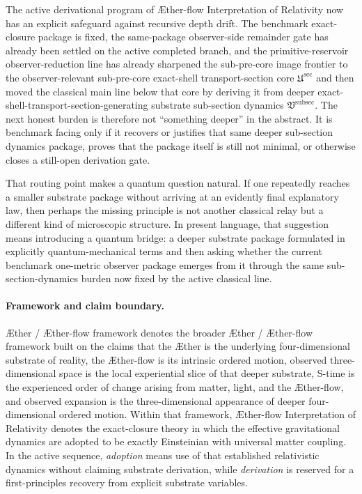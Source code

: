 \documentclass[11pt]{article}
\newcommand{\Aether}{\AE{}ther}
\newcommand{\Aflow}{\AE{}ther-flow}
\newcommand{\TheoryName}{\Aflow{} Interpretation of Relativity}
\newcommand{\TheoryProgram}{\Aether{} / \Aflow{} framework}
\newcommand{\SubPreSectionCore}{\mathfrak U^{\mathrm{sec}}}
\newcommand{\SubSectionPackage}{\mathfrak V^{\mathrm{subsec}}}
\begin{document}
The active derivational program of \TheoryName{} now has an explicit safeguard against recursive depth drift. The benchmark exact-closure package is fixed, the same-package observer-side remainder gate has already been settled on the active completed branch, and the primitive-reservoir observer-reduction line has already sharpened the sub-pre-core image frontier to the observer-relevant sub-pre-core exact-shell transport-section core \(\SubPreSectionCore\) and then moved the classical main line below that core by deriving it from deeper exact-shell-transport-section-generating substrate sub-section dynamics \(\SubSectionPackage\). The next honest burden is therefore not ``something deeper'' in the abstract. It is benchmark facing only if it recovers or justifies that same deeper sub-section dynamics package, proves that the package itself is still not minimal, or otherwise closes a still-open derivation gate.

That routing point makes a quantum question natural. If one repeatedly reaches a smaller substrate package without arriving at an evidently final explanatory law, then perhaps the missing principle is not another classical relay but a different kind of microscopic structure. In present language, that suggestion means introducing a quantum bridge: a deeper substrate package formulated in explicitly quantum-mechanical terms and then asking whether the current benchmark one-metric observer package emerges from it through the same sub-section-dynamics burden now fixed by the active classical line.

\paragraph{Framework and claim boundary.}
\TheoryProgram{} denotes the broader \Aether{} / \Aflow{} framework built on the claims that the \Aether{} is the underlying four-dimensional substrate of reality, the \Aflow{} is its intrinsic ordered motion, observed three-dimensional space is the local experiential slice of that deeper substrate, S-time is the experienced order of change arising from matter, light, and the \Aflow{}, and observed expansion is the three-dimensional appearance of deeper four-dimensional ordered motion. Within that framework, \TheoryName{} denotes the exact-closure theory in which the effective gravitational dynamics are adopted to be exactly Einsteinian with universal matter coupling. In the active sequence, \emph{adoption} means use of that established relativistic dynamics without claiming substrate derivation, while \emph{derivation} is reserved for a first-principles recovery from explicit substrate variables.
\end{document}

